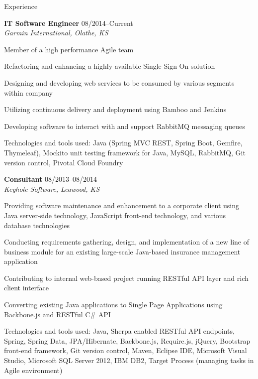 \begin{Large}\textsf{Experience}\end{Large} \vspace{-2mm}

\begin{itemize1}
	\item \textbf{IT Software Engineer} \textopenbullet{} 08/2014--Current \\
		\textit{Garmin International, Olathe, KS} \vspace{-1.5mm}
		\begin{itemize1}
			\item Member of a high performance Agile team
			\item Refactoring and enhancing a highly available Single Sign On solution
			\item Designing and developing web services to be consumed by various segments within company
			\item Utilizing continuous delivery and deployment using Bamboo and Jenkins
			\item Developing software to interact with and support RabbitMQ messaging queues 
			\item Technologies and tools used: Java (Spring MVC REST, Spring Boot, Gemfire, Thymeleaf), Mockito unit testing framework for Java, MySQL, RabbitMQ, Git version control, Pivotal Cloud Foundry
		\end{itemize1}
\end{itemize1}

\begin{itemize1}
	\item \textbf{Consultant} \textopenbullet{} 08/2013--08/2014 \\
		\textit{Keyhole Software, Leawood, KS} \vspace{-1.5mm}
		\begin{itemize1}
			\item Providing software maintenance and enhancement to a corporate client using Java server-side technology, JavaScript front-end technology, and various database technologies
			\item Conducting requirements gathering, design, and implementation of a new line of business module for an existing large-scale Java-based insurance management application
			\item Contributing to internal web-based project running RESTful API layer and rich client interface
			\item Converting existing Java applications to Single Page Applications using Backbone.js and RESTful C\# API
			\item Technologies and tools used: Java, Sherpa enabled RESTful API endpoints, Spring, Spring Data, JPA/Hibernate, Backbone.js, Require.js, jQuery, Bootstrap front-end framework, Git version control, Maven, Eclipse IDE, Microsoft Visual Studio, Microsoft SQL Server 2012, IBM DB2, Target Process (managing tasks in Agile environment)
		\end{itemize1}
\end{itemize1}

